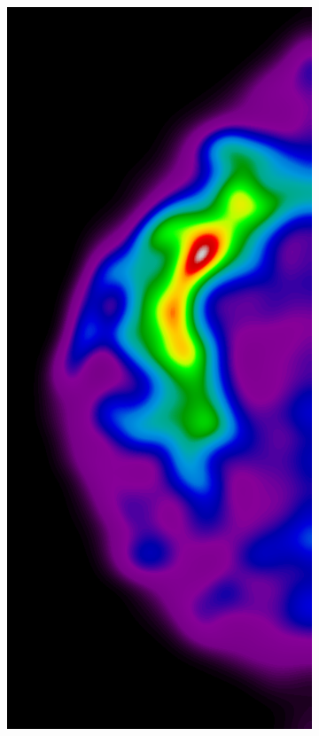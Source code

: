 \begin{figure}[h!]
	\centering
	\begin{subfigure}{0.195\textwidth}
		\centering
			\includegraphics[width=\textwidth]{plots/examples/example3_probs_1_1.png}

\end{subfigure}
\end{figure}
